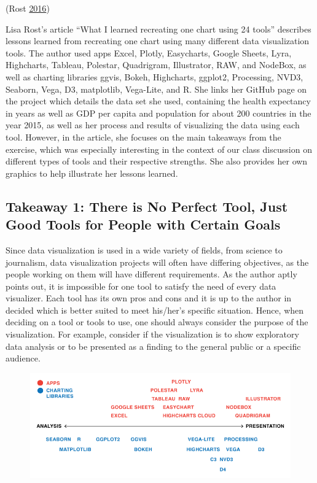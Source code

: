 \documentclass[]{book}
\begin{document}
(Rost \protect\hyperlink{ref-different_tools}{2016})

Lisa Rost's article ``What I learned recreating one chart using 24
tools'' describes lessons learned from recreating one chart using many
different data visualization tools. The author used apps Excel, Plotly,
Easycharts, Google Sheets, Lyra, Highcharts, Tableau, Polestar,
Quadrigram, Illustrator, RAW, and NodeBox, as well as charting libraries
ggvis, Bokeh, Highcharts, ggplot2, Processing, NVD3, Seaborn, Vega, D3,
matplotlib, Vega-Lite, and R. She links her GitHub page on the project
which details the data set she used, containing the health expectancy in
years as well as GDP per capita and population for about 200 countries
in the year 2015, as well as her process and results of visualizing the
data using each tool. However, in the article, she focuses on the main
takeaways from the exercise, which was especially interesting in the
context of our class discussion on different types of tools and their
respective strengths. She also provides her own graphics to help
illustrate her lessons learned.

\subsection{Takeaway 1: There is No Perfect Tool, Just Good Tools for
People with Certain
Goals}\label{takeaway-1-there-is-no-perfect-tool-just-good-tools-for-people-with-certain-goals}

Since data visualization is used in a wide variety of fields, from
science to journalism, data visualization projects will often have
differing objectives, as the people working on them will have different
requirements. As the author aptly points out, it is impossible for one
tool to satisfy the need of every data visualizer. Each tool has its own
pros and cons and it is up to the author in decided which is better
suited to meet his/her's specific situation. Hence, when deciding on a
tool or tools to use, one should always consider the purpose of the
visualization. For example, consider if the visualization is to show
exploratory data analysis or to be presented as a finding to the general
public or a specific audience.

\begin{figure}
\centering
\includegraphics{images/analysis_spectrum.png}
\caption{}
\end{figure}
\end{document}
